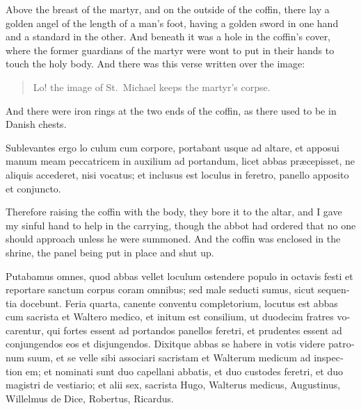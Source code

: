 \documentclass[10pt]{book}
\begin{document}
\begin{paracol}{2}
Above the breast of the martyr, and on the outside of the coffin, there lay a golden angel of the length of a man's foot, having a golden sword in one hand and a standard in the other. And beneath it was a hole in the coffin's cover, where the former guardians of the martyr were wont to put in their hands to touch the holy body. And there was this verse written over the image:
\begin{verse}
Lo! the image of St.\ Michael keeps the martyr's corpse.
\end{verse}
And there were iron rings at the two ends of the coffin, as there used to be in Danish chests.

\switchcolumn*

\begin{otherlanguage}{latin}
Sublevantes ergo lo culum cum corpore, portabant usque ad altare, et apposui manum meam peccatricem in auxilium ad portandum, licet abbas pr\ae{}cepisset, ne aliquis accederet, nisi vocatus; et inclusus est loculus in feretro, panello apposito et conjuncto.
\end{otherlanguage}

\switchcolumn

Therefore raising the coffin with the body, they bore it to the altar, and I gave my sinful hand to help in the carrying, though the abbot had ordered that no one should approach unless he were summoned. And the coffin was enclosed in the shrine, the panel being put in place and shut up.

\switchcolumn*

\begin{otherlanguage}{latin}
Putabamus omnes, quod abbas vellet loculum ostendere populo in octavis festi et reportare sanctum corpus coram omnibus; sed male seducti sumus, sicut sequentia docebunt. Feria quarta, canente conventu completorium, locutus est abbas cum sacrista et Waltero medico, et initum est consilium, ut duodecim fratres vocarentur, qui fortes essent ad portandos panellos feretri, et prudentes essent ad conjungendos eos et disjungendos. Dixitque abbas se habere in votis videre patronum suum, et se velle sibi associari sacristam et Walterum medicum ad inspection em; et nominati sunt duo capellani abbatis, et duo custodes feretri, et duo magistri de vestiario; et alii sex, sacrista Hugo, Walterus medicus, Augustinus, Willelmus de Dice, Robertus, Ricardus.
\end{otherlanguage}

\switchcolumn


\end{paracol}
\end{document}

